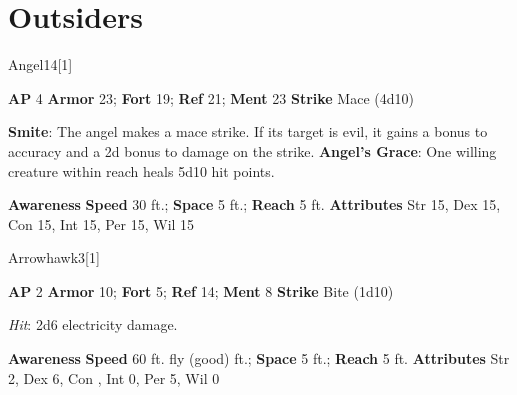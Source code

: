 \section{Outsiders}
\begin{monsection}{Angel}{14}[1]
\vspace{-1em}\vspace{-1em}
\begin{spellcontent}
\begin{spelltargetinginfo}
{\textbf{AP} 4}
\pari \textbf{Armor} 23;
\textbf{Fort} 19;
\textbf{Ref} 21;
\textbf{Ment} 23
\pari \textbf{Strike} Mace  (4d10)
\end{spelltargetinginfo}
\begin{spelleffects}
\pari
\textbf{Smite}:
The angel makes a mace strike.
If its target is evil, it gains a  bonus to accuracy and a \plus2d bonus to damage on the strike.
\vspace{0.5em}
\pari
\textbf{Angel's Grace}:
One willing creature within reach heals 5d10 hit points.
\end{spelleffects}
\end{spellcontent}
\begin{spellsubcontent}
\begin{spellfooter}
\pari \textbf{Awareness} 
\pari \textbf{Speed} 30 ft.;
\textbf{Space} 5 ft.;
\textbf{Reach} 5 ft.
\pari \textbf{Attributes}
Str 15,
Dex 15,
Con 15,
Int 15,
Per 15,
Wil 15
\end{spellfooter}
\end{spellsubcontent}
\end{monsection}
\begin{monsection}{Arrowhawk}{3}[1]
\vspace{-1em}\vspace{-1em}
\begin{spellcontent}
\begin{spelltargetinginfo}
{\textbf{AP} 2}
\pari \textbf{Armor} 10;
\textbf{Fort} 5;
\textbf{Ref} 14;
\textbf{Ment} 8
\pari \textbf{Strike} Bite  (1d10)
\end{spelltargetinginfo}
\begin{spelleffects}
\pari
{}
\par
\par \textit{Hit}: 2d6 electricity damage.
\end{spelleffects}
\end{spellcontent}
\begin{spellsubcontent}
\begin{spellfooter}
\pari \textbf{Awareness} 
\pari \textbf{Speed} 60 ft. fly (good) ft.;
\textbf{Space} 5 ft.;
\textbf{Reach} 5 ft.
\pari \textbf{Attributes}
Str 2,
Dex 6,
Con ,
Int 0,
Per 5,
Wil 0
\end{spellfooter}
\end{spellsubcontent}
\end{monsection}
